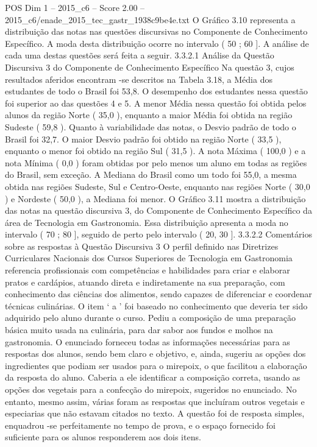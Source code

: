 \begin{textsample}{POS Dim 1 – 2015\_c6 – Score 2.00 – 2015\_c6/enade\_2015\_tec\_gastr\_1938c9be4e.txt}
O Gráfico 3.10 representa a distribuição das notas nas questões discursivas no Componente de Conhecimento Específico.
A moda desta distribuição ocorre no intervalo ( 50 ; 60 ].
A análise de cada uma destas questões será feita a seguir. 3.3.2.1 Análise da Questão Discursiva 3 do Componente de Conhecimento Específico Na questão 3, cujos resultados aferidos encontram -se descritos na Tabela 3.18, a Média dos estudantes de todo o Brasil foi 53,8.
O desempenho dos estudantes nessa questão foi superior ao das questões 4 e 5.
A menor Média nessa questão foi obtida pelos alunos da região Norte ( 35,0 ), enquanto a maior Média foi obtida na região Sudeste ( 59,8 ).
Quanto à variabilidade das notas, o Desvio padrão de todo o Brasil foi 32,7.
O maior Desvio padrão foi obtido na região Norte ( 33,5 ), enquanto o menor foi obtido na região Sul ( 31,5 ).
A nota Máxima ( 100,0 ) e a nota Mínima ( 0,0 ) foram obtidas por pelo menos um aluno em todas as regiões do Brasil, sem exceção.
A Mediana do Brasil como um todo foi 55,0, a mesma obtida nas regiões Sudeste, Sul e Centro-Oeste, enquanto nas regiões Norte ( 30,0 ) e Nordeste ( 50,0 ), a Mediana foi menor.
O Gráfico 3.11 mostra a distribuição das notas na questão discursiva 3, do Componente de Conhecimento Específico da área de Tecnologia em Gastronomia.
Essa distribuição apresenta a moda no intervalo ( 70 ; 80 ], seguido de perto pelo intervalo ( 20, 30 ]. 3.3.2.2 Comentários sobre as respostas à Questão Discursiva 3 O perfil definido nas Diretrizes Curriculares Nacionais dos Cursos Superiores de Tecnologia em Gastronomia referencia profissionais com competências e habilidades para criar e elaborar pratos e cardápios, atuando direta e indiretamente na sua preparação, com conhecimento das ciências dos alimentos, sendo capazes de diferenciar e coordenar técnicas culinárias.
O item ‘ a ’ foi baseado no conhecimento que deveria ter sido adquirido pelo aluno durante o curso.
Pediu a composição de uma preparação básica muito usada na culinária, para dar sabor aos fundos e molhos na gastronomia.
O enunciado forneceu todas as informações necessárias para as respostas dos alunos, sendo bem claro e objetivo, e, ainda, sugeriu as opções dos ingredientes que podiam ser usados para o mirepoix, o que facilitou a elaboração da resposta do aluno.
Caberia a ele identificar a composição correta, usando as opções dos vegetais para a confecção do mirepoix, sugeridos no enunciado.
No entanto, mesmo assim, várias foram as respostas que incluíram outros vegetais e especiarias que não estavam citados no texto.
A questão foi de resposta simples, enquadrou -se perfeitamente no tempo de prova, e o espaço fornecido foi suficiente para os alunos responderem aos dois itens.

\end{textsample}
